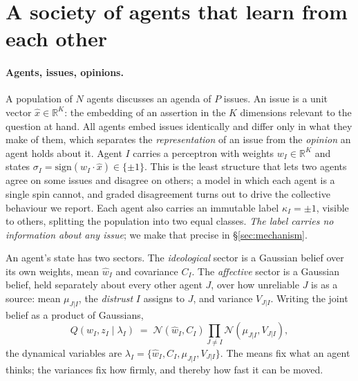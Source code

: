 \section{A society of agents that learn from each other}
\label{sec:model}

\paragraph{Agents, issues, opinions.}
A population of $N$ agents discusses an agenda of $P$ issues. An issue is a unit
vector $\hat{x}\in\mathbb{R}^{K}$: the embedding of an assertion in the $K$
dimensions relevant to the question at hand. All agents embed issues
identically and differ only in what they make of them, which separates the
\emph{representation} of an issue from the \emph{opinion} an agent holds about
it. Agent $I$ carries a perceptron with weights $w_I\in\mathbb{R}^{K}$ and states
$\sigma_I=\mathrm{sign}(w_I\cdot\hat{x})\in\{\pm1\}$. This is the least
structure that lets two agents agree on some issues and disagree on others; a
model in which each agent is a single spin cannot, and graded disagreement turns
out to drive the collective behaviour we report. Each agent also carries an
immutable label $\kappa_I=\pm1$, visible to others, splitting the population into
two equal classes. \emph{The label carries no information about any issue}; we
make that precise in \S\ref{sec:mechanism}.

An agent's state has two sectors. The \emph{ideological} sector is a Gaussian
belief over its own weights, mean $\hat{w}_I$ and covariance $C_I$. The
\emph{affective} sector is a Gaussian belief, held separately about every other
agent $J$, over how unreliable $J$ is as a source: mean $\mu_{J|I}$, the
\emph{distrust} $I$ assigns to $J$, and variance $V_{J|I}$. Writing the joint
belief as a product of Gaussians,
%
\begin{equation}
  Q(w_I, z_I \mid \lambda_I) \;=\; \mathcal{N}(\hat{w}_I, C_I)
  \prod_{J\neq I}\mathcal{N}(\mu_{J|I}, V_{J|I}),
  \label{eq:belief}
\end{equation}
%
the dynamical variables are $\lambda_I=\{\hat{w}_I, C_I, \mu_{J|I}, V_{J|I}\}$.
The means fix what an agent thinks; the variances fix how firmly, and thereby
how fast it can be moved.

